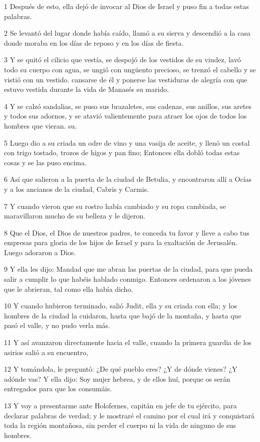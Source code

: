 \par 1 Después de esto, ella dejó de invocar al Dios de Israel y puso fin a todas estas palabras.
\par 2 Se levantó del lugar donde había caído, llamó a su sierva y descendió a la casa donde moraba en los días de reposo y en los días de fiesta.
\par 3 Y se quitó el cilicio que vestía, se despojó de los vestidos de su viudez, lavó todo su cuerpo con agua, se ungió con ungüento precioso, se trenzó el cabello y se vistió con un vestido. cansarse de él y ponerse las vestiduras de alegría con que estuvo vestida durante la vida de Manasés su marido.
\par 4 Y se calzó sandalias, se puso sus brazaletes, sus cadenas, sus anillos, sus aretes y todos sus adornos, y se atavió valientemente para atraer los ojos de todos los hombres que vieran. su.
\par 5 Luego dio a su criada un odre de vino y una vasija de aceite, y llenó un costal con trigo tostado, trozos de higos y pan fino; Entonces ella dobló todas estas cosas y se las puso encima.
\par 6 Así que salieron a la puerta de la ciudad de Betulia, y encontraron allí a Ocías y a los ancianos de la ciudad, Cabris y Carmis.
\par 7 Y cuando vieron que su rostro había cambiado y su ropa cambiada, se maravillaron mucho de su belleza y le dijeron.
\par 8 Que el Dios, el Dios de nuestros padres, te conceda tu favor y lleve a cabo tus empresas para gloria de los hijos de Israel y para la exaltación de Jerusalén. Luego adoraron a Dios.
\par 9 Y ella les dijo: Mandad que me abran las puertas de la ciudad, para que pueda salir a cumplir lo que habéis hablado conmigo. Entonces ordenaron a los jóvenes que le abrieran, tal como ella había dicho.
\par 10 Y cuando hubieron terminado, salió Judit, ella y su criada con ella; y los hombres de la ciudad la cuidaron, hasta que bajó de la montaña, y hasta que pasó el valle, y no pudo verla más.
\par 11 Y así avanzaron directamente hacia el valle, cuando la primera guardia de los asirios salió a su encuentro,
\par 12 Y tomándola, le preguntó: ¿De qué pueblo eres? ¿Y de dónde vienes? ¿Y adónde vas? Y ella dijo: Soy mujer hebrea, y de ellos huí, porque os serán entregados para que los consumáis.
\par 13 Y voy a presentarme ante Holofernes, capitán en jefe de tu ejército, para declarar palabras de verdad; y le mostraré el camino por el cual irá y conquistará toda la región montañosa, sin perder el cuerpo ni la vida de ninguno de sus hombres.
